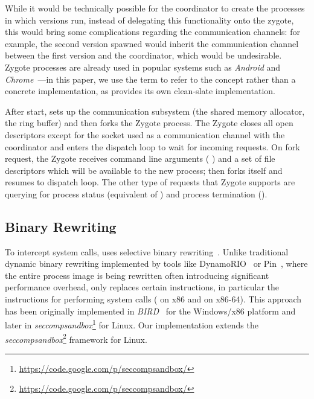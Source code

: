  While it would be technically possible for the coordinator
to create the processes in which versions run, instead of delegating this
functionality onto the zygote, this would bring some complications regarding
the communication channels: for example, the second version spawned would
inherit the communication channel between the first version and the
coordinator, which would be undesirable.  Zygote processes are already used in
popular systems such as \textit{Android} and
\textit{Chrome}~\cite{linuxzygote}---in this paper, we use the term to refer to
the concept rather than a concrete implementation, as \nx provides its own
clean-slate implementation.

After start, \nx sets up the communication subsystem (\ie the shared memory
allocator, the ring buffer) and then forks the Zygote process. The Zygote
closes all open descriptors except for the socket used as a communication
channel with the coordinator and enters the dispatch loop to wait for incoming
requests. On fork request, the Zygote receives command line arguments (\ie
{}) and a set of file descriptors which will be available to the new
process; then forks itself and resumes to dispatch loop. The other type of
requests that Zygote supports are querying for process status (\ie equivalent
of ) and process termination (\ie {}).

\subsection{Binary Rewriting}
\label{sec:rewriting}

To intercept system calls, \nx uses selective binary rewriting~\cite{bird}.
Unlike traditional dynamic binary rewriting implemented by tools like
DynamoRIO~\cite{dynamorio02} or Pin~\cite{pin05}, where the entire process
image is being rewritten often introducing significant performance overhead,
\nx only replaces certain instructions, in particular the instructions for
performing system calls (\ie {} on x86 and  on
x86-64).  This approach has been originally implemented in
\emph{BIRD}~\cite{bird} for the Windows/x86 platform and later in
\emph{seccompsandbox}\footnote{\url{https://code.google.com/p/seccompsandbox/}}
for Linux.  Our implementation extends the
\emph{seccompsandbox}\footnote{\url{https://code.google.com/p/seccompsandbox/}}
framework for Linux.

